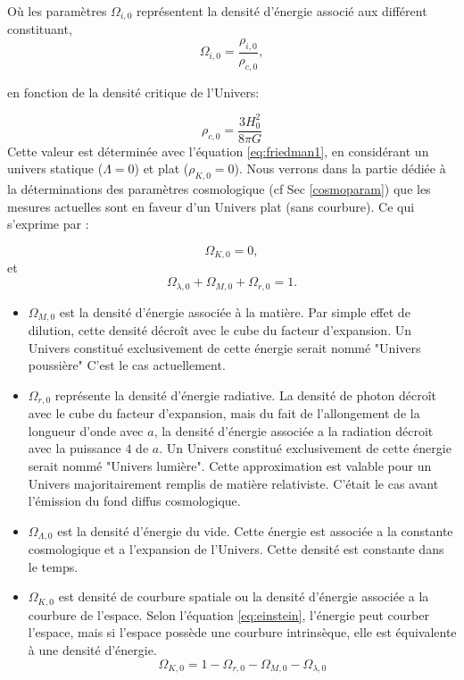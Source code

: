 Où les paramètres $\Omega_{i,0}$ représentent la densité d'énergie associé aux différent constituant, 
\begin{equation}
 \Omega_{i,0} = \frac{\rho_{i,0}}{\rho_{c,0}},
 \end{equation}

en fonction de la densité critique de l'Univers:

\begin{equation}
\rho_{c,0} = \frac{3H_0^2}{8\pi G}
 \end{equation}
Cette valeur est déterminée avec l'équation \ref{eq:friedman1}, en considérant un univers statique ($\Lambda=0$) et plat ($\rho_{K,0}=0$).
Nous verrons dans la partie dédiée à la déterminations des paramètres cosmologique (cf Sec \ref{cosmoparam}) que les mesures actuelles sont en faveur d'un Univers plat (sans courbure).
Ce qui s'exprime par :

\begin{equation}
\Omega_{K,0} = 0,
\end{equation}
et
\begin{equation}
\Omega_{\lambda,0} +  \Omega_{M,0} + \Omega_{r,0} =1.
\end{equation}

\begin{itemize}
\item $\Omega_{M,0}$ est la densité d'énergie associée à la matière.%
Par simple effet de dilution, cette densité décroît avec le cube du facteur d'expansion.
Un Univers constitué exclusivement de cette énergie serait nommé "Univers poussière"
C'est le cas actuellement.

\item $\Omega_{r,0}$ représente la densité d'énergie radiative.
La densité de photon décroît avec le cube du facteur d'expansion, mais du fait de l'allongement de la longueur d'onde avec $a$, la densité d'énergie associée a la radiation décroit avec la puissance $4$ de $a$.
Un Univers constitué exclusivement de cette énergie serait nommé "Univers lumière".
Cette approximation est valable pour un Univers majoritairement remplis de matière relativiste.
C'était le cas avant l’émission du fond diffus cosmologique.

\item $\Omega_{\Lambda,0}$ est la densité d’énergie du vide.
Cette énergie est associée a la constante cosmologique et a l'expansion de l'Univers. 
Cette densité est constante dans le temps.

\item $\Omega_{K,0}$ est densité de courbure spatiale ou la densité d'énergie associée a la courbure de l'espace.
Selon l’équation \ref{eq:einstein}, l'énergie peut courber l'espace, mais si l'espace possède une courbure intrinsèque, elle est équivalente à une densité d'énergie.
\begin{equation}
\Omega_{K,0} = 1 - \Omega_{r,0} - \Omega_{M,0} - \Omega_{\lambda,0} 
\end{equation}

\end{itemize}

